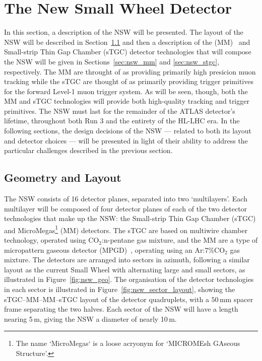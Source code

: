 \section{The New Small Wheel Detector}
\label{sec:nsw_detector}

In this section, a description of the NSW will be presented.
The layout of the NSW will be described in Section~\ref{sec:nsw_geo}
and then a description of the \micromegas (MM)~\cite{Giomataris:1995fq} and Small-strip Thin Gap Chamber (sTGC)
detector technologies that will compose the NSW
will be given in Sections~\ref{sec:nsw_mm} and \ref{sec:nsw_stgc}, respectively.
The MM are throught of as providing primarily high presicion muon tracking
while the sTGC are thought of as primarily providing trigger primitives for the forward Level-1 muon trigger system.
As will be seen, though, both the MM and sTGC technologies will provide both high-quality tracking and trigger primitives.
The NSW must last for the remainder of the ATLAS detector's lifetime, throughout
both Run 3 and the entirety of the HL-LHC era.
In the following sections, the design decisions of the NSW --- related to both its layout 
and detector choices --- will be presented in light of their ability to address
the particular challenges described in the previous section.

\subsection{Geometry and Layout}
\label{sec:nsw_geo}

The NSW consists of 16 detector planes, separated into two `multilayers'.
Each multilayer will be composed of four detector planes of each of the two
detector technologies that make up the NSW: the Small-strip Thin Gap Chamber (sTGC)
and MicroMegas\footnote{The name `MicroMegas` is a loose acryonym for `MICROMEsh GAseous Structure'.} (MM)
detectors.
The sTGC are based on multiwire chamber technology, operated using CO$_2$:n-pentane gas mixture, and the MM are a type of
micropattern gaseous detector (MPGD)~\cite{MPGD}, operating using an Ar:7\%CO$_2$ gas mixture.
The detectors are arranged into sectors in azimuth, following a similar layout
as the current Small Wheel with alternating large and small sectors, as illustrated in Figure~\ref{fig:nsw_geo}.
The organisation of the detector technologies in each sector is illustrated in Figure~\ref{fig:nsw_sector_layout},
showing the sTGC--MM--MM--sTGC layout of the detector quadruplets, with a $50$\,mm spacer
frame separating the two halves.
Each sector of the NSW will have a length nearing 5\,m, giving the NSW a diameter of
nearly 10\,m.

